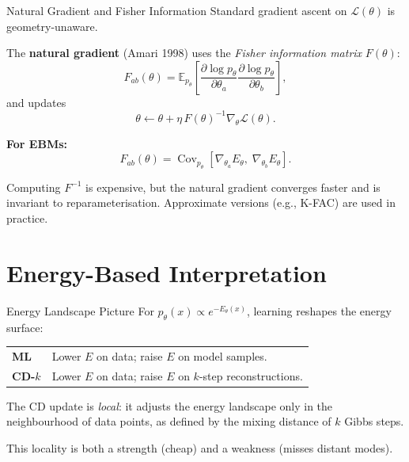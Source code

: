 \documentclass[aspectratio=169]{beamer}
\newcommand{\E}{\mathbb{E}}
\newcommand{\pmodel}{p_{\theta}}
\begin{document}
\begin{frame}{Natural Gradient and Fisher Information}
Standard gradient ascent on $\mathcal{L}(\theta)$ is geometry-unaware.

\medskip
The \textbf{natural gradient} (Amari 1998) uses the \emph{Fisher information
matrix} $F(\theta)$:
\[
  F_{ab}(\theta)
  = \E_{\pmodel}\!\left[
      \frac{\partial\log\pmodel}{\partial\theta_a}
      \frac{\partial\log\pmodel}{\partial\theta_b}
    \right],
\]
and updates
\[
  \theta \leftarrow \theta + \eta\, F(\theta)^{-1}\nabla_\theta\mathcal{L}(\theta).
\]

\textbf{For EBMs:}
\[
  F_{ab}(\theta)
  = \operatorname{Cov}_{\pmodel}\!\left[
      \nabla_{\theta_a}E_\theta,\;
      \nabla_{\theta_b}E_\theta
    \right].
\]

Computing $F^{-1}$ is expensive, but the natural gradient converges faster and is
invariant to reparameterisation.  Approximate versions (e.g., K-FAC) are used in
practice.
\end{frame}

\section{Energy-Based Interpretation}

\begin{frame}{Energy Landscape Picture}
For $\pmodel(x)\propto e^{-E_\theta(x)}$, learning reshapes the energy surface:

\medskip
\begin{center}
\begin{tabular}{ll}
  \textbf{ML} & Lower $E$ on data; raise $E$ on model samples. \\[4pt]
  \textbf{CD-$k$} & Lower $E$ on data; raise $E$ on $k$-step reconstructions.
\end{tabular}
\end{center}

\medskip
The CD update is \emph{local}: it adjusts the energy landscape only in the
neighbourhood of data points, as defined by the mixing distance of $k$ Gibbs steps.

\medskip
This locality is both a strength (cheap) and a weakness (misses distant modes).
\end{frame}
\end{document}
